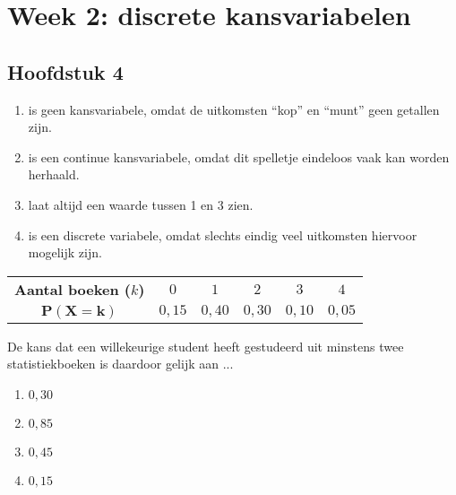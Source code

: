 \chapter*{Week 2: discrete kansvariabelen}

\section*{Hoofdstuk 4}

\begin{enumerate}[label=(\alph*)]
    \item is geen kansvariabele, omdat de uitkomsten ``kop'' en ``munt'' geen getallen zijn.
    \item is een continue kansvariabele, omdat dit spelletje eindeloos vaak kan worden herhaald.
    \item laat altijd een waarde tussen 1 en 3 zien.
    \item is een discrete variabele, omdat slechts eindig veel uitkomsten hiervoor mogelijk zijn.
\end{enumerate}


\begin{tabular}{cccccc}
    \toprule
        {\bfseries Aantal boeken ($k$)} & $0$ & $1$ & $2$ & $3$ & $4$ \\
    \cmidrule{1-1} \cmidrule{2-2} \cmidrule{3-3} \cmidrule{4-4} \cmidrule{5-5} \cmidrule{6-6} 
        $\mathbf{P(X=k)}$ & $0,15$ & $0,40$ & $0,30$ & $0,10$ & $0,05$ \\
    \bottomrule
\end{tabular}

De kans dat een willekeurige student heeft gestudeerd uit minstens twee statistiekboeken is daardoor gelijk aan ...
\begin{enumerate}[label=(\alph*)]
    \item $0,30$
    \item $0,85$
    \item $0,45$
    \item $0,15$
\end{enumerate}

